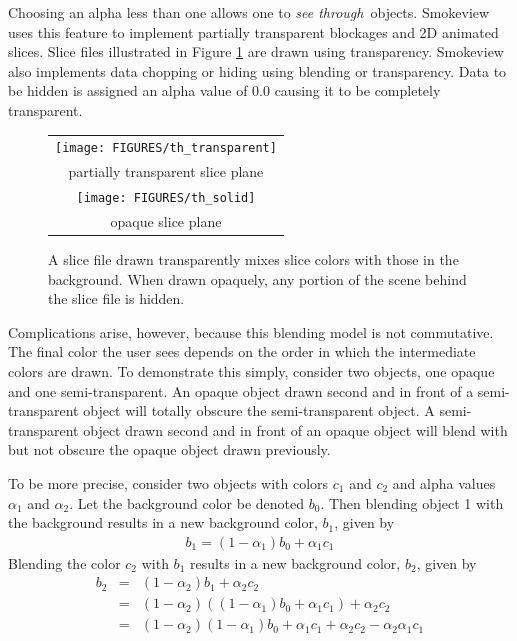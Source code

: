 \documentclass[11pt,twoside]{book}
\newcommand{\figoptions}{htp}
\begin{document}
Choosing an alpha less than one allows one to {\em see through}\
objects. Smokeview uses this feature to implement partially
transparent blockages and 2D animated slices. Slice files
illustrated in Figure \ref{figtransparent} are drawn using
transparency. Smokeview also implements data chopping or hiding
using blending or transparency.  Data to be hidden is assigned an
alpha value of 0.0 causing it to be completely transparent.

\begin{figure}[\figoptions]
\begin{center}
\begin{tabular}{c}
\texttt{[image: FIGURES/th\_transparent]}\\
partially transparent slice plane\\
\texttt{[image: FIGURES/th\_solid]}\\
opaque slice plane\\
\end{tabular}
\end{center}
\caption {A slice file drawn transparently mixes
slice colors with those in the background.  When drawn opaquely,
any portion of the scene behind the slice file is hidden. }
\label{figtransparent}
\end{figure}

Complications arise, however, because this blending model is not commutative.  The final color the user sees depends on the order in which the intermediate colors are drawn. To demonstrate this simply, consider two objects, one opaque and one semi-transparent.  An opaque object drawn second and in front of a semi-transparent object will totally obscure the semi-transparent object. A semi-transparent object drawn second and in front of an opaque object will blend with but not obscure the opaque object drawn previously.

To be more precise, consider two objects with colors $c_1$ and $c_2$ and alpha values $\alpha_1$ and $\alpha_2$.   Let the background color be denoted $b_0$.  Then blending object 1 with the background results in a new background color, $b_1$, given by
\begin{eqnarray*}
b_1=(1-\alpha_1)b_0 + \alpha_1c_1
\end{eqnarray*}
Blending the color $c_2$ with $b_1$ results in a new background color, $b_2$, given by
\begin{eqnarray*}
b_2&=&(1-\alpha_2)b_1 + \alpha_2c_2\\
&=&(1-\alpha_2)((1-\alpha_1)b_0 + \alpha_1c_1)+\alpha_2c_2\\
&=&(1-\alpha_2)(1-\alpha_1)b_0 + \alpha_1c_1 + \alpha_2c_2 - \alpha_2\alpha_1c_1
\end{eqnarray*}
\end{document}
